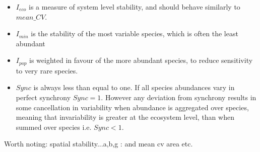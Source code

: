 \begin{itemize}
	\item $I_{eco}$ is a measure of system level stability, and should behave similarly to $mean\_CV$.
	\item $I_{min}$ is the stability of the most variable species, which is often the least abundant \cite{montoya2016invariability}
	\item $I_{pop}$ is weighted in favour of the more abundant species, to reduce sensitivity to very rare species.
	\item $Sync$ is always less than equal to one. If all species abundances vary in perfect synchrony $Sync=1$. However any deviation from synchrony results in some cancellation in variability when abundance is aggregated over species, meaning that invariability is greater at the ecosystem level, than when summed over species i.e. $Sync<1$.
\end{itemize}

Worth noting: spatial stability...a,b,g : and mean cv area etc.

